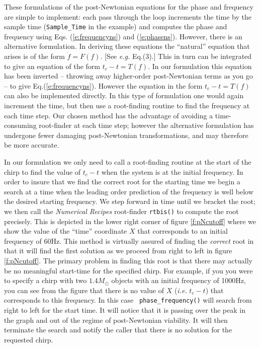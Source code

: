 These formulations of the post-Newtonian equations for the phase and
frequency are simple to implement:  each pass through the loop
increments the time by the sample time ({\tt Sample\_Time} in the
example) and computes the phase and frequency using Eqs.
(\ref{e:frequencyns}) and (\ref{e:phasens}).  However, there is an
alternative formulation.  In deriving these  equations the ``natural''
equation that arises is of the form $\dot f= F(f)$. [See {\it e.g.}
\cite{bdiww} Eq.(3).]  This in turn can be integrated to give an
equation of the form $t_c-t = T(f)$.  In our formulation this equation
has been inverted -- throwing away higher-order post-Newtonian terms as
you go -- to give Eq.(\ref{e:frequencyns}).  However the  equation in
the form  $t_c-t = T(f)$ can also be implemented directly.  In this
type of formulation one would again increment the time, but then use a
root-finding routine to find the frequency at each time step. Our
chosen method has the advantage of avoiding a time-consuming
root-finder at each time step; however the alternative
formulation has undergone fewer damaging post-Newtonian
transformations, and may therefore be more accurate.

In our formulation we only need to call a root-finding routine at the
start of the chirp to find the value of $t_c-t$ when the system is at
the initial frequency.  In order to insure that we find the correct
root for the starting time we begin a search at a time when the leading
order prediction of the frequency is well below the desired starting
frequency.  We step forward in time until we bracket the root; we then
call the {\it Numerical Recipes} root-finder {\tt rtbis()} to compute
the root precisely.  This is depicted in the lower right corner of
figure \ref{f:pNcutoff} where we show the value of the ``time''
coordinate $X$ that corresponds to an initial frequency of $60$Hz.
This method is virtually assured of finding the {\it correct} root in
that it will find the first solution as we proceed from right to left
in figure  \ref{f:pNcutoff}.  The primary problem in finding this root
is that there may actually be no meaningful start-time for the
specified chirp.  For example, if you you were to specify a chirp with
two $1.4M_\odot$ objects with an initial frequency of 1000Hz, you can
see from the figure that there is no value of $X$ ({\it i.e.} $t_c-t$)
that corresponds to this frequency.  In this case {\tt
phase\_frequency()} will search from right to left for the start time.
It will notice that it is passing over the peak in the graph and out of
the regime of post-Newtonian viability.  It will then terminate the
search and notify the caller that there is no solution for the
requested chirp.

